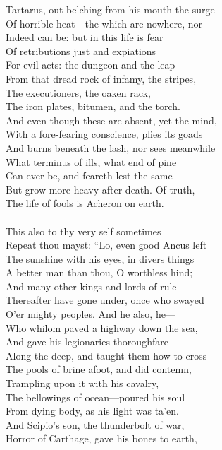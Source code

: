 Tartarus, out-belching from his mouth the surge\\
Of horrible heat—the which are nowhere, nor\\
Indeed can be: but in this life is fear\\
Of retributions just and expiations\\
For evil acts: the dungeon and the leap\\
From that dread rock of infamy, the stripes,\\
The executioners, the oaken rack,\\
The iron plates, bitumen, and the torch.\\
And even though these are absent, yet the mind,\\
With a fore-fearing conscience, plies its goads\\
And burns beneath the lash, nor sees meanwhile\\
What terminus of ills, what end of pine\\
Can ever be, and feareth lest the same\\
But grow more heavy after death. Of truth,\\
The life of fools is Acheron on earth.\\
\\
This also to thy very self sometimes\\
Repeat thou mayst: ``Lo, even good Ancus left\\
The sunshine with his eyes, in divers things\\
A better man than thou, O worthless hind;\\
And many other kings and lords of rule\\
Thereafter have gone under, once who swayed\\
O'er mighty peoples. And he also, he—\\
Who whilom paved a highway down the sea,\\
And gave his legionaries thoroughfare\\
Along the deep, and taught them how to cross\\
The pools of brine afoot, and did contemn,\\
Trampling upon it with his cavalry,\\
The bellowings of ocean—poured his soul\\
From dying body, as his light was ta'en.\\
And Scipio's son, the thunderbolt of war,\\
Horror of Carthage, gave his bones to earth,\\
